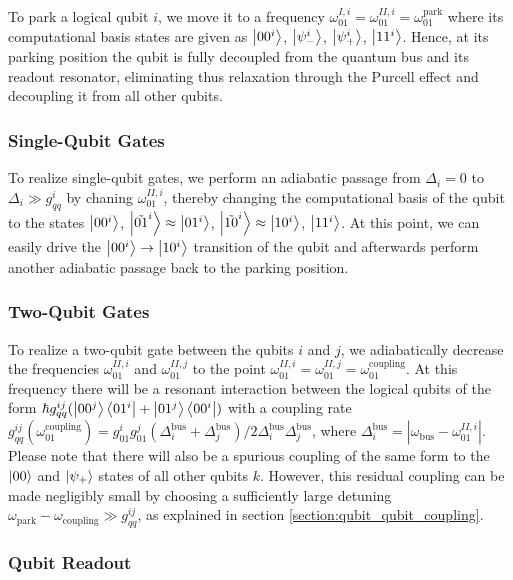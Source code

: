 To park a logical qubit $i$, we move it to a frequency $\omega_{01}^{I,i}=\omega_{01}^{II,i}=\omega_{01}^{\mathrm{park}}$ where its computational basis states are given as $\left| 00^i \right>$, $\left| \psi_-^i \right>$, $\left| \psi_+^i \right>$, $\left| 11^i \right>$. Hence, at its parking position the qubit is fully decoupled from the quantum bus and its readout resonator, eliminating thus relaxation through the Purcell effect and decoupling it from all other qubits. 

\subsubsection{Single-Qubit Gates}

To realize single-qubit gates, we perform an adiabatic passage from $\Delta_i = 0$ to $\Delta_i \gg g_{qq}^i$ by chaning $\omega_{01}^{II,i}$, thereby changing the computational basis of the qubit to the states $\left| 00^i \right>$, $\left| \tilde{01}^i \right>\approx \left| 01^i \right>$, $\left| \tilde{10}^i \right>\approx \left| 10^i \right>$, $\left| 11^i \right>$. At this point, we can easily drive the $\left| 00^i \right>\to\left| 10^i \right>$ transition of the qubit and afterwards perform another adiabatic passage back to the parking position.

\subsubsection{Two-Qubit Gates}

To realize a two-qubit gate between the qubits $i$ and $j$, we adiabatically decrease the frequencies $\omega_{01}^{II,i}$ and $\omega_{01}^{II,j}$ to the point $\omega_{01}^{II,i}=\omega_{01}^{II,j}=\omega_{01}^{\mathrm{coupling}}$. At this frequency there will be a resonant interaction between the logical qubits of the form $\hbar g_{qq}^{ij}(\left| 00^j \right>\left< 01^i \right|+\left| 01^j \right>\left< 00^i \right|)$ with a coupling rate $g_{qq}^{ij}(\omega_{01}^\mathrm{coupling})=g_{01}^i g_{01}^j (\Delta_i^\mathrm{bus}+\Delta_j^\mathrm{bus})/2\Delta_i^{\mathrm{bus}}\Delta_j^\mathrm{bus}$, where $\Delta_i^\mathrm{bus}=|\omega_\mathrm{bus}-\omega_{01}^{II,i}|$. Please note that there will also be a spurious coupling of the same form to the $\left| 00 \right>$ and $\left| \psi_+ \right>$ states of all other qubits $k$. However, this residual coupling can be made negligibly small by choosing a sufficiently large detuning $\omega_\mathrm{park}-\omega_\mathrm{coupling} \gg g_{qq}^{ij}$, as explained in section \ref{section:qubit_qubit_coupling}. 

\subsubsection{Qubit Readout}

